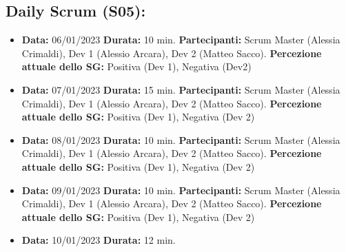 \documentclass[a4paper, oneside]{article}
\newcommand\cinque{Scrum Master (Alessia Crimaldi), Dev 1 (Alessio Arcara), Dev 2 (Matteo Sacco).}
\begin{document}
\begin{landscape}
\begin{tabular}{ | p{6.5cm} | p{3cm} | p{8cm} | p{2.9cm} | p{2.4cm}| }
            \hline
        \end{tabular}

        \newpage
        \normalsize
        \subsection{Daily Scrum (S05):}
        \begin{itemize}
            \item \textbf{Data:} 06/01/2023
            \newline \textbf{Durata:} 10 min.
            \newline \textbf{Partecipanti:} \cinque
            \newline \textbf{Percezione attuale dello SG:} Positiva (Dev 1), Negativa (Dev2)
        \end{itemize}
        \begin{itemize}
            \item \textbf{Data:} 07/01/2023
            \newline \textbf{Durata:} 15 min.
            \newline \textbf{Partecipanti:} \cinque
            \newline \textbf{Percezione attuale dello SG:} Positiva (Dev 1), Negativa (Dev 2)
        \end{itemize}
        \begin{itemize}
            \item \textbf{Data:} 08/01/2023
            \newline \textbf{Durata:} 10 min.
            \newline \textbf{Partecipanti:} \cinque
            \newline \textbf{Percezione attuale dello SG:} Positiva (Dev 1), Negativa (Dev 2)
        \end{itemize}
        \begin{itemize}
            \item \textbf{Data:} 09/01/2023
            \newline \textbf{Durata:} 10 min.
            \newline \textbf{Partecipanti:} \cinque
            \newline \textbf{Percezione attuale dello SG:} Positiva (Dev 1), Negativa (Dev 2)
        \end{itemize}
        \begin{itemize}
            \item \textbf{Data:} 10/01/2023
            \newline \textbf{Durata:} 12 min.

\end{itemize}
\end{landscape}
\end{document}
